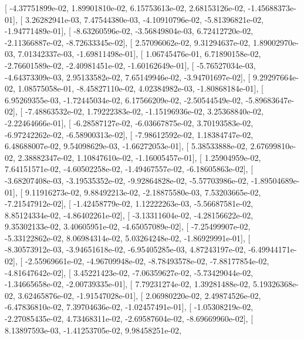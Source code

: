 \documentclass{article}
\begin{document}
       [ -4.37751899e-02,   1.89901810e-02,   6.15753613e-02,
          2.68153126e-02,  -1.45688373e-01],
       [  3.26282941e-03,   7.47544380e-03,  -4.10910796e-02,
         -5.81396821e-02,  -1.94771489e-01],
       [ -8.63260596e-02,  -3.56849804e-03,   6.72412720e-02,
         -2.11366887e-02,  -8.72633345e-02],
       [  2.57096062e-02,   9.31294637e-02,   1.89002970e-03,
          7.01342337e-03,  -1.69811498e-01],
       [  1.06745476e-01,   6.71890158e-02,  -2.76601589e-02,
         -2.40981451e-02,  -1.60162649e-01],
       [ -5.76527034e-03,  -4.64373309e-03,   2.95133582e-02,
          7.65149946e-02,  -3.94701697e-02],
       [  9.29297664e-02,   1.08575058e-01,  -8.45827110e-02,
          4.02384982e-03,  -1.80868184e-01],
       [  6.95269355e-03,  -1.72445034e-02,   6.17566209e-02,
         -2.50544549e-02,  -5.89683647e-02],
       [ -7.48863532e-02,   1.79222383e-02,  -1.15196936e-02,
          3.25368840e-02,  -2.22464666e-01],
       [ -6.28587127e-02,  -6.03667875e-02,   3.70193583e-02,
         -6.97242262e-02,  -6.58900313e-02],
       [ -7.98612592e-02,   1.18384747e-02,   6.48688007e-02,
          9.54098629e-03,  -1.66272053e-01],
       [  5.38533888e-02,   2.67699810e-02,   2.38882347e-02,
          1.10847610e-02,  -1.16005457e-01],
       [  1.25904959e-02,   7.64151571e-02,  -4.60502258e-02,
         -1.49467557e-02,  -6.18605863e-02],
       [ -3.68207408e-03,  -3.19535352e-02,  -9.92864828e-02,
         -5.57703986e-02,  -1.89504689e-01],
       [  9.11916273e-02,   9.88492213e-02,  -2.18875580e-03,
          7.53203665e-02,  -7.21547912e-02],
       [ -1.42458779e-02,   1.12222263e-03,  -5.56687581e-02,
          8.85124334e-02,  -4.86402261e-02],
       [ -3.13311604e-02,  -4.28156622e-02,   9.35302133e-02,
          3.40605951e-02,  -4.65057089e-02],
       [ -7.25499907e-02,  -5.33122862e-02,   8.06984314e-02,
          5.03264248e-02,  -1.86929991e-01],
       [ -8.30573912e-03,  -3.94651618e-02,  -6.95405285e-03,
          4.87243197e-02,  -6.49944171e-02],
       [ -2.55969661e-02,  -4.96709948e-02,  -8.78493578e-02,
         -7.88177854e-02,  -4.81647642e-02],
       [  3.45221423e-02,  -7.06359627e-02,  -5.73429044e-02,
         -1.34665658e-02,  -2.00739335e-01],
       [  7.79231274e-02,   1.39281488e-02,   5.19326368e-02,
          3.62465876e-02,  -1.91547028e-01],
       [  2.06980220e-02,   2.49874526e-02,  -6.47836810e-02,
          7.39704636e-02,  -1.02457491e-01],
       [ -1.05308219e-02,  -2.27085435e-02,   4.73468311e-02,
         -2.69587604e-02,  -8.69669960e-02],
       [  8.13897593e-03,  -1.41253705e-02,   9.98458251e-02,
\end{document}

